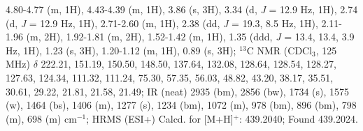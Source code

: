 4.80-4.77 (m, 1H), 4.43-4.39 (m, 1H), 3.86 (s, 3H), 3.34 (d, \textit{J} = 12.9 Hz, 1H), 2.74 (d, \textit{J} = 12.9
Hz, 1H), 2.71-2.60 (m, 1H), 2.38 (dd, \textit{J} = 19.3, 8.5 Hz, 1H), 2.11-1.96 (m, 2H), 1.92-1.81 (m, 2H), 1.52-1.42 (m, 1H), 1.35 (ddd, \textit{J} = 13.4, 13.4, 3.9 Hz, 1H), 1.23 (s, 3H), 1.20-1.12 (m, 1H),
0.89 (s, 3H); $^{13}$C NMR (CDCl$_3$, 125 MHz) $\delta$ 222.21, 151.19, 150.50, 148.50, 137.64, 132.08,
128.64, 128.54, 128.27, 127.63, 124.34, 111.32, 111.24, 75.30, 57.35, 56.03, 48.82, 43.20, 38.17,
35.51, 30.61, 29.22, 21.81, 21.58, 21.49; IR (neat) 2935 (bm), 2856 (bw), 1734 (s), 1575 (w),
1464 (bs), 1406 (m), 1277 (s), 1234 (bm), 1072 (m), 978 (bm), 896 (bm), 798 (m), 698 (m) cm$^{-1}$;
HRMS (ESI+) Calcd. for  [M+H]$^+$: 439.2040; Found 439.2024.

